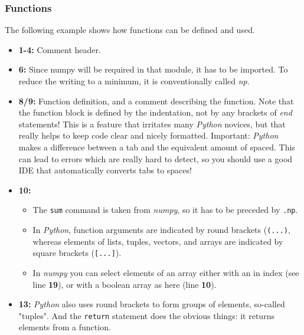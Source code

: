 \subsubsection{Functions}
The following example shows how functions can be defined and used.



\begin{itemize}
  \item \textbf{1-4:} Comment header.

  \item \textbf{6:} Since numpy will be required in that module, it has to be imported. To reduce the writing to a minimum, it is conventionally called \emph{np}.

  \item \textbf{8/9:} Function definition, and a comment describing the function. Note that the function block is defined by the indentation, not by any brackets of \emph{end} statements! This is a feature that irritates many \emph{Python} novices, but that really helps to keep code clear and nicely formatted. Important: \emph{Python} makes a difference between a tab and the equivalent amount of spaced. This can lead to errors which are really hard to detect, so you should use a good IDE that automatically converts tabs to spaces!

  \item \textbf{10:}
    \begin{itemize}
      \item The \lstinline{sum} command is taken from \emph{numpy}, so it has to be preceded by \lstinline{.np}.
      \item In \emph{Python}, function arguments are indicated by round brackets (\lstinline{(...)}, whereas elements of lists, tuples, vectors, and arrays are indicated by square brackets (\lstinline{[...]}).
      \item In \emph{numpy} you can select elements of an array either with an in index (see line \textbf{19}), or with a boolean array as here (line \textbf{10}).
    \end{itemize}

  \item \textbf{13:} \emph{Python} also uses round brackets to form groups of elements, so-called "tuples". And the \lstinline{return} statement does the obvious things: it returns elements from a function.


\end{itemize}

